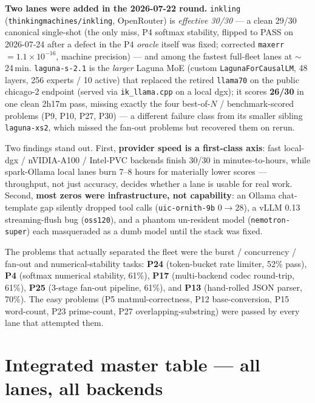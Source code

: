 \documentclass[11pt]{article}
\begin{document}
\textbf{Two lanes were added in the 2026-07-22 round.} \texttt{inkling}
(\texttt{thinkingmachines/inkling}, OpenRouter) is \emph{effective 30/30} --- a clean
29/30 canonical single-shot (the only miss, P4 softmax stability, flipped to PASS on
2026-07-24 after a defect in the P4 \emph{oracle} itself was fixed; corrected
\texttt{maxerr}${=}1.1{\times}10^{-16}$, machine precision) --- and among the fastest
full-fleet lanes at $\sim$24\,min. \texttt{laguna-s-2.1} is the \emph{larger} Laguna MoE
(custom \texttt{LagunaForCausalLM}, 48 layers, 256 experts / 10 active) that replaced
the retired \texttt{llama70} on the public chicago-2 endpoint (served via
\texttt{ik\_llama.cpp} on a local dgx); it scores \textbf{26/30} in one clean 2h17m
pass, missing exactly the four best-of-$N$ / benchmark-scored problems
(P9, P10, P27, P30) --- a different failure class from its smaller sibling
\texttt{laguna-xs2}, which missed the fan-out problems but recovered them on rerun.

Two findings stand out. First, \textbf{provider speed is a first-class axis}: fast
local-dgx / nVIDIA-A100 / Intel-PVC backends finish 30/30 in minutes-to-hours, while
spark-Ollama local lanes burn 7--8 hours for materially lower scores --- throughput,
not just accuracy, decides whether a lane is usable for real work. Second,
\textbf{most zeros were infrastructure, not capability}: an Ollama chat-template gap
silently dropped tool calls (\texttt{uic-ornith-9b} $0\to28$), a vLLM 0.13
streaming-flush bug (\texttt{oss120}), and a phantom un-resident model
(\texttt{nemotron-super}) each masqueraded as a dumb model until the stack was fixed.

The problems that actually separated the fleet were the burst / concurrency / fan-out
and numerical-stability tasks: \textbf{P24} (token-bucket rate limiter, 52\% pass),
\textbf{P4} (softmax numerical stability, 61\%), \textbf{P17} (multi-backend codec
round-trip, 61\%), \textbf{P25} (3-stage fan-out pipeline, 61\%), and \textbf{P13}
(hand-rolled JSON parser, 70\%). The easy problems (P5 matmul-correctness, P12
base-conversion, P15 word-count, P23 prime-count, P27 overlapping-substring) were
passed by every lane that attempted them.

\section{Integrated master table --- all lanes, all backends}
\end{document}
